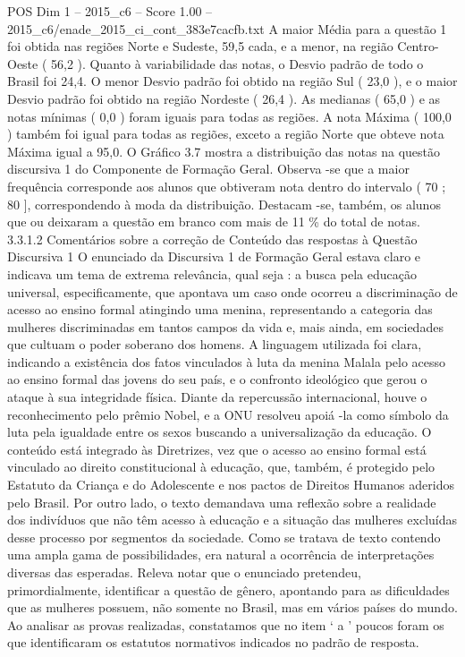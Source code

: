 \begin{textsample}{POS Dim 1 – 2015\_c6 – Score 1.00 – 2015\_c6/enade\_2015\_ci\_cont\_383e7cacfb.txt}
A maior Média para a questão 1 foi obtida nas regiões Norte e Sudeste, 59,5 cada, e a menor, na região Centro-Oeste ( 56,2 ).
Quanto à variabilidade das notas, o Desvio padrão de todo o Brasil foi 24,4.
O menor Desvio padrão foi obtido na região Sul ( 23,0 ), e o maior Desvio padrão foi obtido na região Nordeste ( 26,4 ).
As medianas ( 65,0 ) e as notas mínimas ( 0,0 ) foram iguais para todas as regiões.
A nota Máxima ( 100,0 ) também foi igual para todas as regiões, exceto a região Norte que obteve nota Máxima igual a 95,0.
O Gráfico 3.7 mostra a distribuição das notas na questão discursiva 1 do Componente de Formação Geral.
Observa -se que a maior frequência corresponde aos alunos que obtiveram nota dentro do intervalo ( 70 ; 80 ], correspondendo à moda da distribuição.
Destacam -se, também, os alunos que ou deixaram a questão em branco com mais de 11 \% do total de notas. 3.3.1.2 Comentários sobre a correção de Conteúdo das respostas à Questão Discursiva 1 O enunciado da Discursiva 1 de Formação Geral estava claro e indicava um tema de extrema relevância, qual seja : a busca pela educação universal, especificamente, que apontava um caso onde ocorreu a discriminação de acesso ao ensino formal atingindo uma menina, representando a categoria das mulheres discriminadas em tantos campos da vida e, mais ainda, em sociedades que cultuam o poder soberano dos homens.
A linguagem utilizada foi clara, indicando a existência dos fatos vinculados à luta da menina Malala pelo acesso ao ensino formal das jovens do seu país, e o confronto ideológico que gerou o ataque à sua integridade física.
Diante da repercussão internacional, houve o reconhecimento pelo prêmio Nobel, e a ONU resolveu apoiá -la como símbolo da luta pela igualdade entre os sexos buscando a universalização da educação.
O conteúdo está integrado às Diretrizes, vez que o acesso ao ensino formal está vinculado ao direito constitucional à educação, que, também, é protegido pelo Estatuto da Criança e do Adolescente e nos pactos de Direitos Humanos aderidos pelo Brasil.
Por outro lado, o texto demandava uma reflexão sobre a realidade dos indivíduos que não têm acesso à educação e a situação das mulheres excluídas desse processo por segmentos da sociedade.
Como se tratava de texto contendo uma ampla gama de possibilidades, era natural a ocorrência de interpretações diversas das esperadas.
Releva notar que o enunciado pretendeu, primordialmente, identificar a questão de gênero, apontando para as dificuldades que as mulheres possuem, não somente no Brasil, mas em vários países do mundo.
Ao analisar as provas realizadas, constatamos que no item ‘ a ’ poucos foram os que identificaram os estatutos normativos indicados no padrão de resposta.

\end{textsample}
